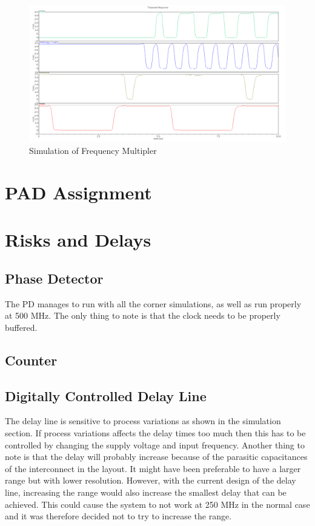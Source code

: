\documentclass[a4paper,12pt]{article} \usepackage{graphicx}
\begin{document}
\begin{figure}[p]
        \centering
        \includegraphics[width=\textwidth]{../Bilder/freq_mult_signals.png}
        \caption{Simulation of Frequency Multipler}
        \label{fig:freq_mult_signals}
\end{figure}

\section{PAD Assignment} %
\section{Risks and Delays}
\subsection{Phase Detector}
The PD manages to run with all the corner simulations, as well as run properly
at 500 MHz. The only thing to note is that the clock needs to be properly buffered.

\subsection{Counter}
\subsection{Digitally Controlled Delay Line}
The delay line is sensitive to process variations as shown in the simulation
section. If process variations affects the delay times too much then this has to
be controlled by changing the supply voltage and input frequency. Another thing
to note is that the delay will probably increase because of the parasitic capacitances of
the interconnect in the layout. It might have been preferable to have a larger
range but with lower resolution. However, with the current design of the delay
line, increasing the range would also increase the smallest delay that can be
achieved. This could cause the system to not work at 250 MHz in the normal case
and it was therefore decided not to try to increase the range. 
\end{document}
